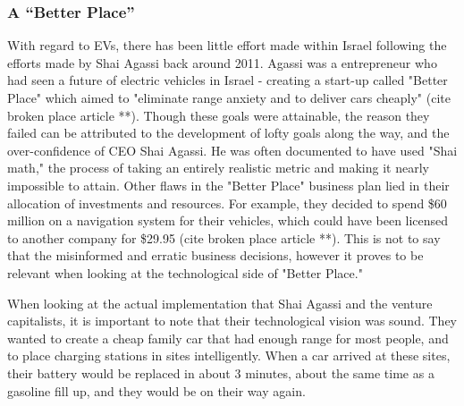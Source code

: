 \documentclass{article}                         %
\begin{document}
\subsubsection{A ``Better Place''}
With regard to EVs, there has been little effort made within Israel following the efforts made by Shai Agassi back around 2011. Agassi was a entrepreneur who had seen a future of electric vehicles in Israel - creating a start-up called "Better Place" which aimed to "eliminate range anxiety and to deliver cars cheaply" (cite broken place article **). Though these goals were attainable, the reason they failed can be attributed to the development of lofty goals along the way, and the over-confidence of CEO Shai Agassi. He was often documented to have used "Shai math," the process of taking an entirely realistic metric and making it nearly impossible to attain. Other flaws in the "Better Place" business plan lied in their allocation of investments and resources. For example, they decided to spend \$60 million on a navigation system for their vehicles, which could have been licensed to another company for \$29.95 (cite broken place article **). This is not to say that the misinformed and erratic business decisions, however it proves to be relevant when looking at the technological side of "Better Place." 

When looking at the actual implementation that Shai Agassi and the venture capitalists, it is important to note that their technological vision was sound. They wanted to create a cheap family car that had enough range for most people, and to place charging stations in sites intelligently. When a car arrived at these sites, their battery would be replaced in about 3 minutes, about the same time as a gasoline fill up, and they would be on their way again. 

\end{document}
